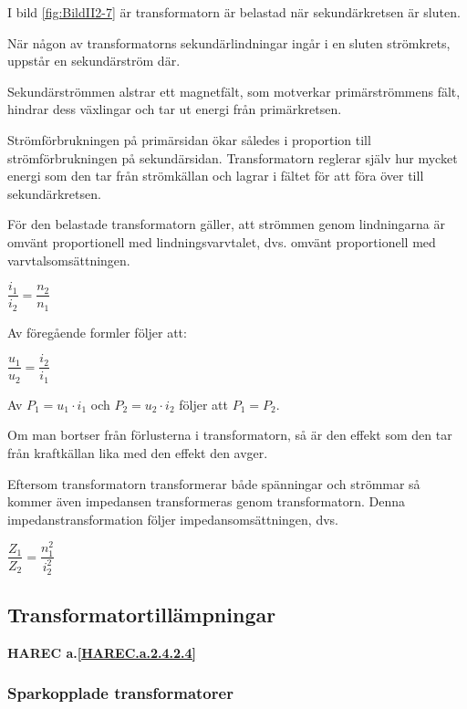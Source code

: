 I bild \ref{fig:BildII2-7} är transformatorn är belastad när sekundärkretsen
är sluten.

När någon av transformatorns sekundärlindningar ingår i en sluten strömkrets,
uppstår en sekundärström där.

Sekundärströmmen alstrar ett magnetfält, som motverkar primärströmmens fält,
hindrar dess växlingar och tar ut energi från primärkretsen.

Strömförbrukningen på primärsidan ökar således i proportion till
strömförbrukningen på sekundärsidan. Transformatorn reglerar själv hur mycket
energi som den tar från strömkällan och lagrar i fältet för att föra över
till sekundärkretsen.

För den belastade transformatorn gäller, att strömmen genom lindningarna är
omvänt proportionell med lindningsvarvtalet, dvs. omvänt proportionell med
varvtalsomsättningen.

\(\dfrac{i_1}{i_2} = \dfrac{n_2}{n_1}\)

Av föregående formler följer att:

\(\dfrac{u_1}{u_2} = \dfrac{i_2}{i_1}\)

Av \(P_1 = u_1 \cdot i_1\) och \(P_2 = u_2 \cdot i_2\) följer att \(P_1 = P_2\).

Om man bortser från förlusterna i transformatorn, så är den effekt som den tar
från kraftkällan lika med den effekt den avger.

Eftersom transformatorn transformerar både spänningar och strömmar så kommer
även impedansen transformeras genom transformatorn.
Denna impedanstransformation följer impedansomsättningen, dvs.

\(\dfrac{Z_1}{Z_2} = \dfrac{n_1^2}{i_2^2}\)

\subsection{Transformatortillämpningar}
\textbf{HAREC a.\ref{HAREC.a.2.4.2.4}\label{myHAREC.a.2.4.2.4}}

\subsubsection{Sparkopplade transformatorer}

